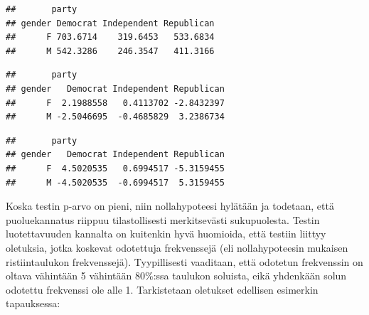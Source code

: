 \documentclass[
]{book}
\newenvironment{Shaded}{\begin{snugshade}}{\end{snugshade}}
\newcommand{\CommentTok}[1]{\textcolor[rgb]{0.56,0.35,0.01}{\textit{#1}}}
\newcommand{\DecValTok}[1]{\textcolor[rgb]{0.00,0.00,0.81}{#1}}
\newcommand{\FunctionTok}[1]{\textcolor[rgb]{0.00,0.00,0.00}{#1}}
\newcommand{\NormalTok}[1]{#1}
\newcommand{\SpecialCharTok}[1]{\textcolor[rgb]{0.00,0.00,0.00}{#1}}
\begin{document}
\begin{Shaded}
\end{Shaded}

\begin{verbatim}
##       party
## gender Democrat Independent Republican
##      F 703.6714    319.6453   533.6834
##      M 542.3286    246.3547   411.3166
\end{verbatim}

\begin{Shaded}
\end{Shaded}

\begin{verbatim}
##       party
## gender   Democrat Independent Republican
##      F  2.1988558   0.4113702 -2.8432397
##      M -2.5046695  -0.4685829  3.2386734
\end{verbatim}

\begin{Shaded}
\end{Shaded}

\begin{verbatim}
##       party
## gender   Democrat Independent Republican
##      F  4.5020535   0.6994517 -5.3159455
##      M -4.5020535  -0.6994517  5.3159455
\end{verbatim}

Koska testin p-arvo on pieni, niin nollahypoteesi hylätään ja todetaan, että puoluekannatus riippuu tilastollisesti merkitsevästi sukupuolesta. Testin luotettavuuden kannalta on kuitenkin hyvä huomioida, että testiin liittyy oletuksia, jotka koskevat odotettuja frekvenssejä (eli nollahypoteesin mukaisen ristiintaulukon frekvenssejä). Tyypillisesti vaaditaan, että odotetun frekvenssin on oltava vähintään 5 vähintään 80\%:ssa taulukon soluista, eikä yhdenkään solun odotettu frekvenssi ole alle 1. Tarkistetaan oletukset edellisen esimerkin tapauksessa:

\begin{Shaded}
\end{Shaded}
\end{document}
